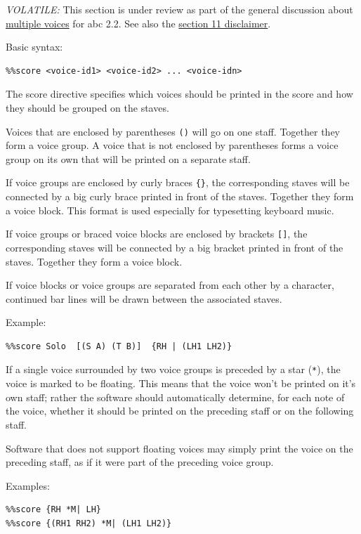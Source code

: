 \documentclass[oneside]{book}
\begin{document}
\emph{VOLATILE:} This section is under review as part of the general
discussion about \protect\hyperlink{multiple_voices}{multiple voices}
for abc 2.2. See also the \protect\hyperlink{disclaimer}{section 11
disclaimer}.

Basic syntax:

\begin{verbatim}
%%score <voice-id1> <voice-id2> ... <voice-idn>
\end{verbatim}

The score directive specifies which voices should be printed in the
score and how they should be grouped on the staves.

Voices that are enclosed by parentheses \texttt{()} will go on one
staff. Together they form a voice group. A voice that is not enclosed by
parentheses forms a voice group on its own that will be printed on a
separate staff.

If voice groups are enclosed by curly braces \texttt{\{\}}, the
corresponding staves will be connected by a big curly brace printed in
front of the staves. Together they form a voice block. This format is
used especially for typesetting keyboard music.

If voice groups or braced voice blocks are enclosed by brackets
\texttt{{[}{]}}, the corresponding staves will be connected by a big
bracket printed in front of the staves. Together they form a voice
block.

If voice blocks or voice groups are separated from each other by a
\texttt{\textbar{}} character, continued bar lines will be drawn between
the associated staves.

Example:

\begin{verbatim}
%%score Solo  [(S A) (T B)]  {RH | (LH1 LH2)}
\end{verbatim}

If a single voice surrounded by two voice groups is preceded by a star
(\texttt{*}), the voice is marked to be floating. This means that the
voice won't be printed on it's own staff; rather the software should
automatically determine, for each note of the voice, whether it should
be printed on the preceding staff or on the following staff.

Software that does not support floating voices may simply print the
voice on the preceding staff, as if it were part of the preceding voice
group.

Examples:

\begin{verbatim}
%%score {RH *M| LH}
%%score {(RH1 RH2) *M| (LH1 LH2)}
\end{verbatim}
\end{document}
